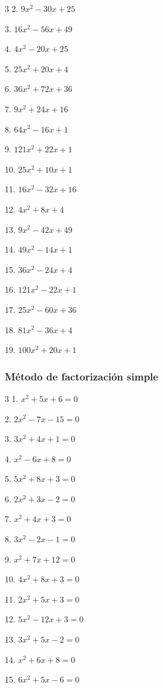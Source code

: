 \documentclass[12pt]{article}
\theoremstyle{plain}
\theoremstyle{definition}
\theoremstyle{remark}
\begin{document}
{\begin{multicols}{3}
2. $9x^2 - 30x + 25$

3. $16x^2 - 56x + 49$

4. $4x^2 - 20x + 25$

5. $25x^2 + 20x + 4$

6. $36x^2 + 72x + 36$

7. $9x^2 + 24x + 16$

8. $64x^2 - 16x + 1$

9. $121x^2 + 22x + 1$

10. $25x^2 + 10x + 1$

11. $16x^2 - 32x + 16$

12. $4x^2 + 8x + 4$

13. $9x^2 - 42x + 49$

14. $49x^2 - 14x + 1$

15. $36x^2 - 24x + 4$

16. $121x^2 - 22x + 1$

17. $25x^2 - 60x + 36$

18. $81x^2 - 36x + 4$

19. $100x^2 + 20x + 1$

\end{multicols}

\subsubsection*{Método de factorización simple}
\begin{multicols}{3}
1. $x^2 + 5x + 6 = 0$

2. $2x^2 - 7x - 15 = 0$

3. $3x^2 + 4x + 1 = 0$

4. $x^2 - 6x + 8 = 0$

5. $5x^2 + 8x + 3 = 0$

6. $2x^2 + 3x - 2 = 0$

7. $x^2 + 4x + 3 = 0$

8. $3x^2 - 2x - 1 = 0$

9. $x^2 + 7x + 12 = 0$

10. $4x^2 + 8x + 3 = 0$

11. $2x^2 + 5x + 3 = 0$

12. $5x^2 - 12x + 3 = 0$

13. $3x^2 + 5x - 2 = 0$

14. $x^2 + 6x + 8 = 0$

15. $6x^2 + 5x - 6 = 0$
\end{multicols}
}
\end{document}
